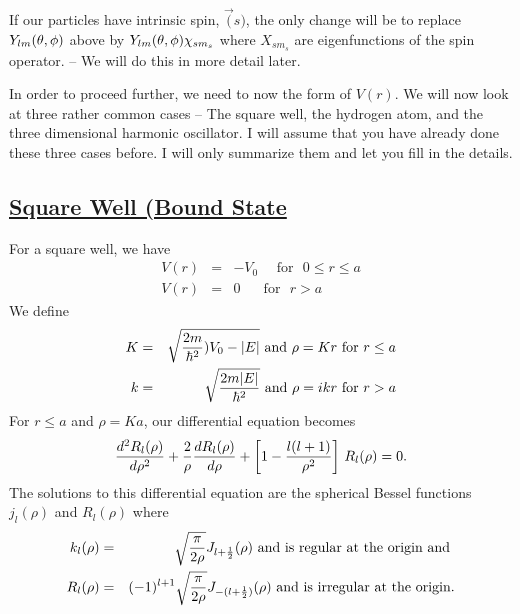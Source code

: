 If our particles have intrinsic spin, $\vec(s)$, the only change will be to replace $Y_{lm}(\theta,\phi)$ above by $Y_{lm}(\theta,\phi) \chi_{sm_s}$ where $X_{sm_s}$ are eigenfunctions of the spin operator. -- We will do this in more detail later. 

In order to proceed further, we need to now the form of $V(r)$. We will now look at three rather common cases -- The square well, the hydrogen atom, and the three dimensional harmonic oscillator. I will assume that you 
have already done these three cases before. I will only summarize them and let you fill in the details.

\subsection{\underline{Square Well (Bound State}}
For a square well, we have 
\begin{eqnarray*}
V(r) &=& - V_0\mbox{~~~ for ~} 0\le r \le a \\
V(r) &=& 0 \mbox{~~~~ for ~} r > a
\end{eqnarray*}
We define 
\begin{eqnarray*}
K &=&  \sqrt{ {2m\over\hbar^2} )V_0 - |E| } \mbox{ and } \rho = Kr \mbox{ for } r\le a \\
k &=& \sqrt{{2m|E|\over\hbar^2}}\mbox{  and  } \rho = ikr \mbox{ for } r>a
\end{eqnarray*}
For $r\le a$ and $\rho = Ka$, our differential equation becomes 
\[ {d^2R_l(\rho)\over d\rho^2} + {2\over\rho} {dR_l(\rho)\over d\rho} + \left[ 1- {l(l+1)\over\rho^2}   \right]\, R_l(\rho) = 0. \]
The solutions to this differential equation are the spherical Bessel functions $j_l(\rho)$ and $R_l(\rho)$ where 
\begin{eqnarray*}
k_l(\rho) &=& \sqrt{\pi\over2\rho} J_{l+{1\over2}} (\rho) \mbox{ and is regular at the origin and }\\
R_l(\rho) &=& (-1)^{l+1} \sqrt{\pi\over2\rho} J_{-(l+{1\over2})}(\rho) \mbox{ and is irregular at the origin}.
\end{eqnarray*}




